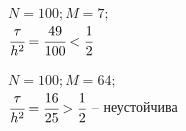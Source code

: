 \documentclass[12pt]{extarticle}
\numberwithin{equation}{section}
\begin{document}
\begin{figure}[H]
\begin{minipage}[h]{0.43\linewidth}
 $N=100; M=7;$\\$ \cfrac{\tau}{h^2} = \cfrac{49}{100} < \cfrac{1}{2}$
\end{minipage}
\hfill
\begin{minipage}[h]{0.43\linewidth}
 $N=100; M=64;$\\$ \cfrac{\tau}{h^2} = \cfrac{16}{25} > \cfrac{1}{2}$ -- неустойчива
\end{minipage}
\end{figure}
\end{document}
